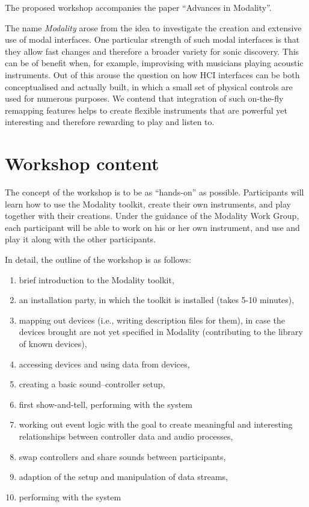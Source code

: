 \documentclass{article}
\begin{document}
The proposed workshop accompanies the paper ``Advances in Modality''.

The name \emph{Modality} arose from the idea to investigate the creation and extensive use of modal interfaces.
One particular strength of such modal interfaces is that they allow fast changes and therefore a broader variety for sonic discovery.
This can be of benefit when, for example, improvising with musicians playing acoustic instruments.
Out of this arouse the question on how HCI interfaces can be both conceptualised and actually built, in which a small set of physical controls are used for numerous purposes.
We contend that integration of such on-the-fly remapping features helps to create flexible instruments that are powerful yet interesting and therefore rewarding to play and listen to. 


\section{Workshop content}
\label{sec:workshop_content}

The concept of the workshop is to be as “hands-­on” as possible.
Participants will learn how to use the Modality toolkit, create their own instruments, and play together with their creations. 
Under the guidance of the Modality Work Group, each participant will be able to work on his or her own instrument, and use and play it along with the other participants.

In detail, the outline of the workshop is as follows:

\begin{enumerate}\itemsep0em
	\item brief introduction to the Modality toolkit,
	\item an installation party, in which the toolkit is installed (takes 5-10 minutes),
	\item mapping out devices (i.e., writing description files for them), in case the devices brought are not yet specified in Modality (contributing to the library of known devices),
	\item accessing devices and using data from devices,
	\item creating a basic sound--controller setup,
	\item first show-and-tell, performing with the system
	\item working out event logic with the goal to create meaningful and interesting relationships between controller data and audio processes,
	\item swap controllers and share sounds between participants,
	\item adaption of the setup and manipulation of data streams,
	\item performing with the system
\end{enumerate}
\end{document}
